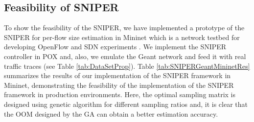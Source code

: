 %
%

\subsection{Feasibility of SNIPER} 
To show the feasibility of the SNIPER, we have implemented a prototype of the SNIPER for per-flow size estimation in Mininet which is a network testbed for developing OpenFlow and SDN experiments \cite{MininetOrg}. We implement the SNIPER controller in POX and, also, we emulate the Geant network and feed it with real traffic traces (see Table \ref{tab:DataSetProp}). Table \ref{tab:SNIPERGeantMininetRes} summarizes the results of our implementation of the SNIPER framework in Mininet, demonstrating the feasibility of the implementation of the SNIPER framework in production environments. Here, the optimal sampling matrix is designed using genetic algorithm for different sampling ratios and, it is clear that the OOM designed by the GA can obtain a better estimation accuracy.

